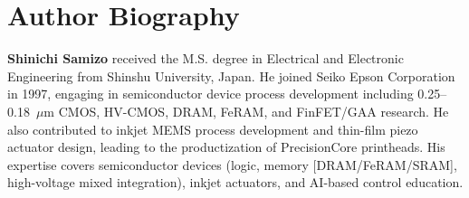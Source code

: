 \documentclass[conference]{IEEEtran}
\begin{document}
\section*{Author Biography}
\textbf{Shinichi Samizo} received the M.S. degree in Electrical and Electronic Engineering
from Shinshu University, Japan. He joined Seiko Epson Corporation in 1997,
engaging in semiconductor device process development including 0.25--0.18~$\mu$m
CMOS, HV-CMOS, DRAM, FeRAM, and FinFET/GAA research. He also contributed to
inkjet MEMS process development and thin-film piezo actuator design, leading to
the productization of PrecisionCore printheads. His expertise covers
semiconductor devices (logic, memory [DRAM/FeRAM/SRAM], high-voltage mixed
integration), inkjet actuators, and AI-based control education.
\end{document}
